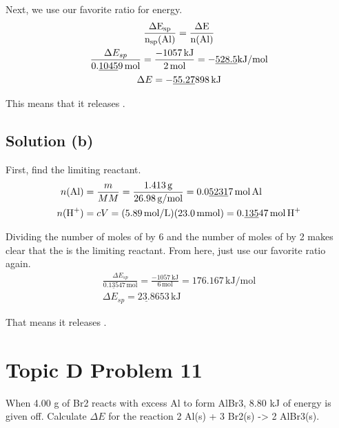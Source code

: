 \documentclass[10pt]{article}
\newcommand{\U}[1]{\underline{#1}}
\begin{document}
            Next, we use our favorite ratio for energy.
            \begin{gather}
                \rm
                \frac{\Delta E_{sp}}{n_{sp}(Al)}    =   \frac{\Delta E}{n(Al)}\\
                \frac{\Delta E_{sp}}{0.\U{1045}9\,\unit{\mole}} =   \frac{-1057\,\unit{\kilo\joule}}{2\,\unit{\mole}}
                    =   -\U{528.5}\unit{\kilo\joule/\mole}\\
                \Delta E    =   -\U{55.27}898\,\unit{\kilo\joule}
            \end{gather}

            This means that it releases . 

        \subsection{Solution (b)}
            First, find the limiting reactant.
            \begin{align}
                n(\ce{Al})  &=  \frac{m}{MM}
                    =   \frac{1.413\,\unit{\gram}}{26.98\,\unit{\gram/\mole}}
                    =   0.0\U{5231}7\,\unit{\mole}\,\ce{Al}\\
                n(\ce{H+})  &=  cV
                    =   (5.89\,\unit{\mole/\liter}) (23.0\,\unit{\milli\mole})
                    =   0.\U{135}47\,\unit{\mole}\,\ce{H+}
            \end{align}

            Dividing the number of moles of  by 6 and the number of moles of  by 2 makes clear that the  is the limiting reactant.
            From here, just use our favorite ratio again.
            \begin{gather}
                \frac{\Delta E_{sp}}{0.\U{135}47\,\unit{\mole}}    =   \frac{-1057\,\unit{\kilo\joule}}{6\,\unit{\mole}}
                    =   176.167\,\unit{\kilo\joule/\mole}\\
                \Delta E_{sp}   =   \U{23.8}653\,\unit{\kilo\joule}
            \end{gather}

            That means it releases . 

    \pagebreak
    \section{Topic D Problem 11}
        When 4.00 g of Br2 reacts with excess Al to form AlBr3, 8.80 kJ of energy is given off.
        Calculate $\Delta E$ for the reaction 2 Al(s) + 3 Br2(s) -> 2 AlBr3(s).
        
\end{document}
